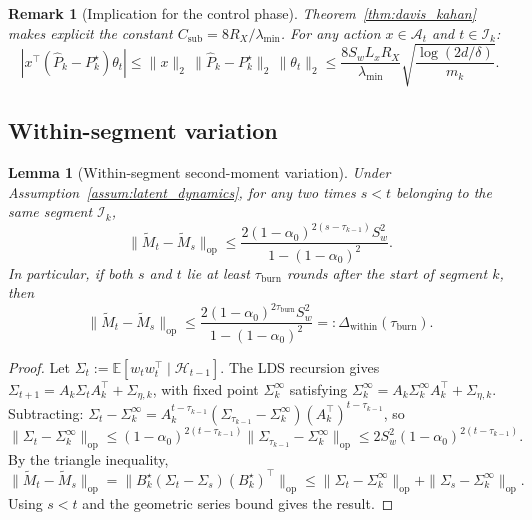 \documentclass[12pt]{article}
\newcommand{\E}{\mathbb{E}}
\newcommand{\op}{\mathrm{op}}
\newcommand{\cA}{\mathcal{A}}
\newcommand{\cH}{\mathcal{H}}
\newcommand{\cI}{\mathcal{I}}
\newtheorem{lemma}{Lemma}
\newtheorem{remark}{Remark}
\theoremstyle{plain}
\theoremstyle{definition}
\begin{document}
\begin{remark}[Implication for the control phase]
\label{rem:control_implication}
Theorem~\ref{thm:davis_kahan} makes explicit the constant $C_{\mathrm{sub}} = 8R_X / \lambda_{\min}$. For any action $x \in \cA_t$ and $t \in \cI_k$:
\[
|x^\top (\widehat{P}_k - P_k^\star)\theta_t|
\le \|x\|_2\, \|\widehat{P}_k - P_k^\star\|_2\, \|\theta_t\|_2
\le \frac{8S_w L_x R_X}{\lambda_{\min}} \sqrt{\frac{\log(2d/\delta)}{m_k}}.
\]
\end{remark}

\subsection{Within-segment variation}

\begin{lemma}[Within-segment second-moment variation]
\label{lem:within_segment_variation}
Under Assumption~\ref{assum:latent_dynamics}, for any two times $s < t$ belonging to the same segment $\cI_k$,
\begin{equation}
\|\widetilde{M}_t - \widetilde{M}_s\|_{\op}
\le \frac{2(1-\alpha_0)^{2(s-\tau_{k-1})} S_w^2}{1-(1-\alpha_0)^2}.
\label{eq:within_variation}
\end{equation}
In particular, if both $s$ and $t$ lie at least $\tau_{\mathrm{burn}}$ rounds after the start of segment $k$, then
\[
\|\widetilde{M}_t - \widetilde{M}_s\|_{\op}
\le \frac{2(1-\alpha_0)^{2\tau_{\mathrm{burn}}} S_w^2}{1-(1-\alpha_0)^2}
=: \Delta_{\mathrm{within}}(\tau_{\mathrm{burn}}).
\]
\end{lemma}

\begin{proof}
Let $\Sigma_t := \E[w_t w_t^\top \mid \cH_{t-1}]$. The LDS recursion gives $\Sigma_{t+1} = A_k \Sigma_t A_k^\top + \Sigma_{\eta,k}$, with fixed point $\Sigma_k^\infty$ satisfying $\Sigma_k^\infty = A_k \Sigma_k^\infty A_k^\top + \Sigma_{\eta,k}$. Subtracting: $\Sigma_t - \Sigma_k^\infty = A_k^{t-\tau_{k-1}}(\Sigma_{\tau_{k-1}} - \Sigma_k^\infty)(A_k^\top)^{t-\tau_{k-1}}$, so
\[
\|\Sigma_t - \Sigma_k^\infty\|_{\op} \le (1-\alpha_0)^{2(t-\tau_{k-1})} \|\Sigma_{\tau_{k-1}} - \Sigma_k^\infty\|_{\op} \le 2S_w^2 (1-\alpha_0)^{2(t-\tau_{k-1})}.
\]
By the triangle inequality,
\[
\|\widetilde{M}_t - \widetilde{M}_s\|_{\op}
= \|B_k^\star(\Sigma_t - \Sigma_s)(B_k^\star)^\top\|_{\op}
\le \|\Sigma_t - \Sigma_k^\infty\|_{\op} + \|\Sigma_s - \Sigma_k^\infty\|_{\op}.
\]
Using $s < t$ and the geometric series bound gives the result.
\end{proof}
\end{document}
